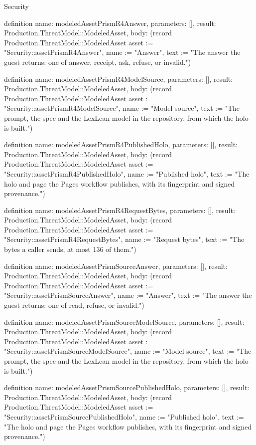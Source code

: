\begin{lexlean}{Security}
\begin{semanticmodule}
definition{
  name: modeledAssetPrismR4Answer,
  parameters: [],
  result: Production.ThreatModel::ModeledAsset,
  body: (record Production.ThreatModel::ModeledAsset {asset := "Security::assetPrismR4Answer", name := "Answer", text := "The answer the guest returns: one of answer, receipt, ask, refuse, or invalid."})
}

definition{
  name: modeledAssetPrismR4ModelSource,
  parameters: [],
  result: Production.ThreatModel::ModeledAsset,
  body: (record Production.ThreatModel::ModeledAsset {asset := "Security::assetPrismR4ModelSource", name := "Model source", text := "The prompt, the spec and the LexLean model in the repository, from which the holo is built."})
}

definition{
  name: modeledAssetPrismR4PublishedHolo,
  parameters: [],
  result: Production.ThreatModel::ModeledAsset,
  body: (record Production.ThreatModel::ModeledAsset {asset := "Security::assetPrismR4PublishedHolo", name := "Published holo", text := "The holo and page the Pages workflow publishes, with its fingerprint and signed provenance."})
}

definition{
  name: modeledAssetPrismR4RequestBytes,
  parameters: [],
  result: Production.ThreatModel::ModeledAsset,
  body: (record Production.ThreatModel::ModeledAsset {asset := "Security::assetPrismR4RequestBytes", name := "Request bytes", text := "The bytes a caller sends, at most 136 of them."})
}

definition{
  name: modeledAssetPrismSourceAnswer,
  parameters: [],
  result: Production.ThreatModel::ModeledAsset,
  body: (record Production.ThreatModel::ModeledAsset {asset := "Security::assetPrismSourceAnswer", name := "Answer", text := "The answer the guest returns: one of read, refuse, or invalid."})
}

definition{
  name: modeledAssetPrismSourceModelSource,
  parameters: [],
  result: Production.ThreatModel::ModeledAsset,
  body: (record Production.ThreatModel::ModeledAsset {asset := "Security::assetPrismSourceModelSource", name := "Model source", text := "The prompt, the spec and the LexLean model in the repository, from which the holo is built."})
}

definition{
  name: modeledAssetPrismSourcePublishedHolo,
  parameters: [],
  result: Production.ThreatModel::ModeledAsset,
  body: (record Production.ThreatModel::ModeledAsset {asset := "Security::assetPrismSourcePublishedHolo", name := "Published holo", text := "The holo and page the Pages workflow publishes, with its fingerprint and signed provenance."})
}


\end{semanticmodule}
\end{lexlean}
